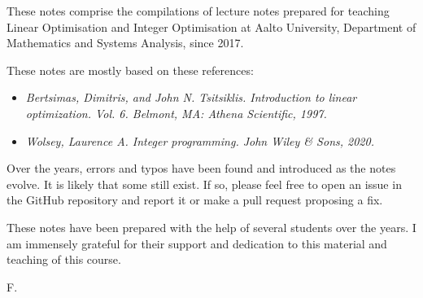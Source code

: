 These notes comprise the compilations of lecture notes prepared for teaching Linear Optimisation and Integer Optimisation at Aalto University, Department of Mathematics and Systems Analysis, since 2017.

These notes are mostly based on these references:

\begin{itemize}
    \item \textit{Bertsimas, Dimitris, and John N. Tsitsiklis. Introduction to linear optimization. Vol. 6. Belmont, MA: Athena Scientific, 1997.}
    \item \textit{Wolsey, Laurence A. Integer programming. John Wiley \& Sons, 2020.}
\end{itemize}

Over the years, errors and typos have been found and introduced as the notes evolve. It is likely that some still exist. If so, please feel free to open an issue in the GitHub repository and report it or make a pull request proposing a fix.

These notes have been prepared with the help of several students over the years. I am immensely grateful for their support and dedication to this material and teaching of this course.

F.